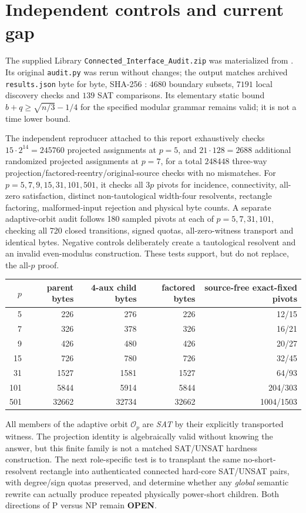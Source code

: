 \documentclass[11pt]{article}
\begin{document}
\section{Independent controls and current gap}
The supplied Library \texttt{Connected\_Interface\_Audit.zip} was materialized from . Its original \texttt{audit.py} was rerun without changes; the output matches archived \texttt{results.json} byte for byte, SHA-256 : $4680$ boundary subsets, $7191$ local discovery checks and $139$ SAT comparisons. Its elementary static bound $b+q\ge\sqrt{n/3}-1/4$ for the specified modular grammar remains valid; it is not a time lower bound.

The independent reproducer attached to this report exhaustively checks $15\cdot2^{14}=245760$ projected assignments at $p=5$, and $21\cdot128=2688$ additional randomized projected assignments at $p=7$, for a total $248448$ three-way projection/factored-reentry/original-source checks with no mismatches. For $p=5,7,9,15,31,101,501$, it checks all $3p$ pivots for incidence, connectivity, all-zero satisfaction, distinct non-tautological width-four resolvents, rectangle factoring, malformed-input rejection and physical byte counts. A separate adaptive-orbit audit follows 180 sampled pivots at each of $p=5,7,31,101$, checking all 720 closed transitions, signed quotas, all-zero-witness transport and identical bytes. Negative controls deliberately create a tautological resolvent and an invalid even-modulus construction. These tests support, but do not replace, the all-$p$ proof.

\begin{center}\begin{tabular}{rrrrr}\toprule
$p$ & parent bytes & 4-aux child bytes & factored bytes & source-free exact-fixed pivots\\\midrule
5&226&276&226&12/15\\7&326&378&326&16/21\\9&426&480&426&20/27\\15&726&780&726&32/45\\31&1527&1581&1527&64/93\\101&5844&5914&5844&204/303\\501&32662&32734&32662&1004/1503\\\bottomrule\end{tabular}\end{center}

All members of the adaptive orbit $\mathcal O_p$ are \emph{SAT} by their explicitly transported witness. The projection identity is algebraically valid without knowing the answer, but this finite family is not a matched SAT/UNSAT hardness construction. The next role-specific test is to transplant the same no-short-resolvent rectangle into authenticated connected hard-core SAT/UNSAT pairs, with degree/sign quotas preserved, and determine whether any \emph{global} semantic rewrite can actually produce repeated physically power-short children. Both directions of P versus NP remain \textbf{OPEN}.
\end{document}
